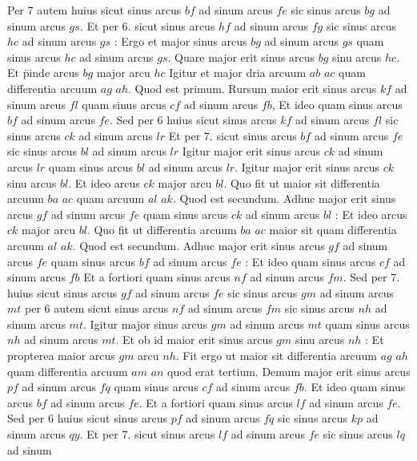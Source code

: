 \documentclass[11pt,a4paper]{article}
\begin{document}
Per 7 autem huius sicut sinus arcus $bf$ ad sinum arcus $fe$ sic sinus arcus $bg$ ad sinum arcus $gs$. Et per 6. sicut sinus arcus $hf$ ad sinum arcus $fg$ sic sinus arcus $hc$ ad sinum arcus $gs$ : Ergo et major sinus arcus $bg$ ad sinum arcus $gs$ quam sinus arcus $hc$ ad sinum arcus $gs$. Quare major erit sinus arcus $bg$ sinu arcus $hc$. Et p̄inde arcus $bg$  major arcu $hc$ Igitur et major dria arcuum $ab$ $ac$ quam differentia arcuum $ag$ $ah$. Quod est primum. Rursum maior erit sinus arcus $kf$ ad sinum arcus $fl$ quam sinus arcus $cf$ ad sinum arcus $fb$, Et ideo quam sinus arcus $bf$ ad sinum arcus $fe$. Sed per 6 huius sicut sinus arcus $kf$ ad sinum arcus $fl$ sic sinus arcus $ck$ ad sinum arcus $lr$ Et per 7. sicut sinus arcus $bf$ ad sinum arcus $fe$ sic sinus arcus $bl$ ad sinum arcus $lr$ Igitur major erit sinus arcus $ck$ ad sinum arcus $lr$ quam sinus arcus $bl$ ad sinum arcus $lr$. Igitur major erit sinus arcus $ck$ sinu arcus $bl$. Et ideo arcus $ck$ major arcu $bl$. Quo fit ut maior sit differentia arcuum $ba$ $ac$ quam arcuum $al$ $ak$. Quod est secundum. Adhuc major erit sinus arcus $gf$ ad sinum arcus $fe$ quam sinus arcus $ck$ ad sinum arcus $bl$ : Et ideo arcus $ck$ major arcu $bl$. Quo fit ut differentia arcuum $ba$ $ac$ maior sit quam differentia arcuum $al$ $ak$. Quod est secundum. Adhuc major erit sinus arcus $gf$ ad sinum arcus $fe$ quam sinus arcus $bf$ ad sinum arcus $fe$ : Et ideo quam sinus arcus $cf$ ad sinum arcus $fb$ Et a fortiori quam sinus arcus $nf$ ad sinum arcus $fm$. Sed per 7. huius sicut sinus arcus $gf$ ad sinum arcus $fe$ sic sinus arcus $gm$ ad sinum arcus $mt$ per 6 autem sicut sinus arcus $nf$ ad sinum arcus $fm$ sic sinus arcus $nh$ ad sinum arcus $mt$. Igitur major sinus arcus $gm$ ad sinum arcus $mt$ quam sinus arcus $nh$ ad sinum arcus $mt$. Et ob id maior erit sinus arcus $gm$ sinu arcus $nh$ : Et propterea maior arcus $gm$ arcu $nh$. Fit ergo ut maior sit differentia arcuum $ag$ $ah$ quam differentia arcuum $am$ $an$ quod erat tertium. Demum major erit sinus arcus $pf$ ad sinum arcus $fq$ quam sinus arcus $cf$ ad sinum arcus $fb$. Et ideo quam sinus arcus $bf$ ad sinum arcus $fe$. Et a fortiori quam sinus arcus  $lf$ ad sinum arcus $fe$. Sed per 6 huius sicut sinus arcus $pf$ ad sinum arcus $fq$ sic sinus arcus $kp$ ad sinum arcus $qy$. Et per 7. sicut sinus arcus $lf$ ad sinum arcus $fe$ sic sinus arcus $lq$ ad sinum
\end{document}
